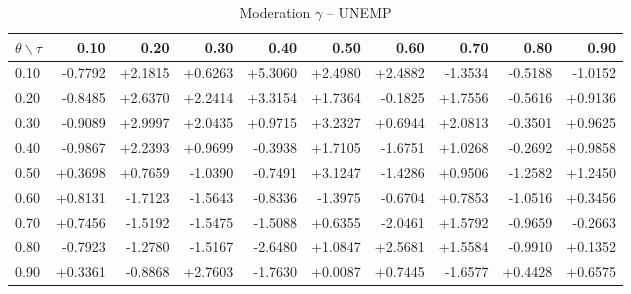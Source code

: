\begin{table}[!htbp]
  \centering
  \caption{Moderation $\gamma$ -- UNEMP}
  \label{tab:mqqr_gamma_UNEMP}
  \begin{tabular}{lrrrrrrrrr}
    \toprule
    $\theta \backslash \tau$ & 0.10 & 0.20 & 0.30 & 0.40 & 0.50 & 0.60 & 0.70 & 0.80 & 0.90 \\
    \midrule
    0.10 & -0.7792 & +2.1815 & +0.6263 & +5.3060 & +2.4980 & +2.4882 & -1.3534 & -0.5188 & -1.0152 \\
    0.20 & -0.8485 & +2.6370 & +2.2414 & +3.3154 & +1.7364 & -0.1825 & +1.7556 & -0.5616 & +0.9136 \\
    0.30 & -0.9089 & +2.9997 & +2.0435 & +0.9715 & +3.2327 & +0.6944 & +2.0813 & -0.3501 & +0.9625 \\
    0.40 & -0.9867 & +2.2393 & +0.9699 & -0.3938 & +1.7105 & -1.6751 & +1.0268 & -0.2692 & +0.9858 \\
    0.50 & +0.3698 & +0.7659 & -1.0390 & -0.7491 & +3.1247 & -1.4286 & +0.9506 & -1.2582 & +1.2450 \\
    0.60 & +0.8131 & -1.7123 & -1.5643 & -0.8336 & -1.3975 & -0.6704 & +0.7853 & -1.0516 & +0.3456 \\
    0.70 & +0.7456 & -1.5192 & -1.5475 & -1.5088 & +0.6355 & -2.0461 & +1.5792 & -0.9659 & -0.2663 \\
    0.80 & -0.7923 & -1.2780 & -1.5167 & -2.6480 & +1.0847 & +2.5681 & +1.5584 & -0.9910 & +0.1352 \\
    0.90 & +0.3361 & -0.8868 & +2.7603 & -1.7630 & +0.0087 & +0.7445 & -1.6577 & +0.4428 & +0.6575 \\
    \bottomrule
  \end{tabular}
\end{table}